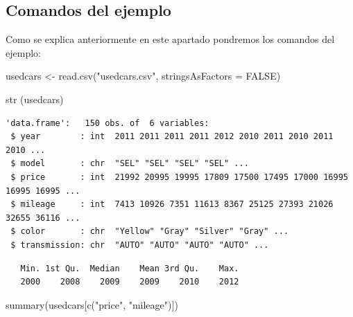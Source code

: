 \documentclass[
  letterpaper,
  DIV=11,
  numbers=noendperiod]{scrartcl}
\newenvironment{Shaded}{\begin{snugshade}}{\end{snugshade}}
\newcommand{\AttributeTok}[1]{\textcolor[rgb]{0.40,0.45,0.13}{#1}}
\newcommand{\ConstantTok}[1]{\textcolor[rgb]{0.56,0.35,0.01}{#1}}
\newcommand{\FunctionTok}[1]{\textcolor[rgb]{0.28,0.35,0.67}{#1}}
\newcommand{\NormalTok}[1]{\textcolor[rgb]{0.00,0.23,0.31}{#1}}
\newcommand{\OtherTok}[1]{\textcolor[rgb]{0.00,0.23,0.31}{#1}}
\newcommand{\SpecialCharTok}[1]{\textcolor[rgb]{0.37,0.37,0.37}{#1}}
\newcommand{\StringTok}[1]{\textcolor[rgb]{0.13,0.47,0.30}{#1}}
\begin{document}
\hypertarget{comandos-del-ejemplo}{%
\subsection{Comandos del ejemplo}\label{comandos-del-ejemplo}}

Como se explica anteriormente en este apartado pondremos los comandos
del ejemplo:

\begin{Shaded}
\begin{Highlighting}[]
\NormalTok{usedcars }\OtherTok{\textless{}{-}} \FunctionTok{read.csv}\NormalTok{(}\StringTok{"usedcars.csv"}\NormalTok{, }\AttributeTok{stringsAsFactors =} \ConstantTok{FALSE}\NormalTok{)}
\end{Highlighting}
\end{Shaded}

\begin{Shaded}
\begin{Highlighting}[]
\FunctionTok{str}\NormalTok{ (usedcars)}
\end{Highlighting}
\end{Shaded}

\begin{verbatim}
'data.frame':   150 obs. of  6 variables:
 $ year        : int  2011 2011 2011 2011 2012 2010 2011 2010 2011 2010 ...
 $ model       : chr  "SEL" "SEL" "SEL" "SEL" ...
 $ price       : int  21992 20995 19995 17809 17500 17495 17000 16995 16995 16995 ...
 $ mileage     : int  7413 10926 7351 11613 8367 25125 27393 21026 32655 36116 ...
 $ color       : chr  "Yellow" "Gray" "Silver" "Gray" ...
 $ transmission: chr  "AUTO" "AUTO" "AUTO" "AUTO" ...
\end{verbatim}

\begin{Shaded}
\end{Shaded}

\begin{verbatim}
   Min. 1st Qu.  Median    Mean 3rd Qu.    Max. 
   2000    2008    2009    2009    2010    2012 
\end{verbatim}

\begin{Shaded}
\begin{Highlighting}[]
\FunctionTok{summary}\NormalTok{(usedcars[}\FunctionTok{c}\NormalTok{(}\StringTok{"price"}\NormalTok{, }\StringTok{"mileage"}\NormalTok{)])}
\end{Highlighting}
\end{Shaded}
\end{document}
